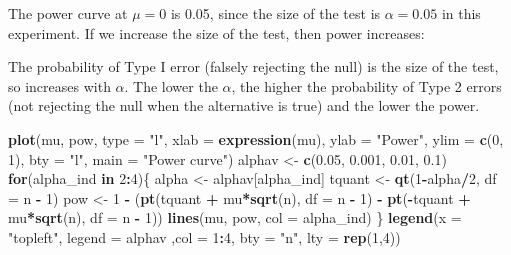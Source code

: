 \documentclass[]{book}
\newenvironment{Shaded}{\begin{snugshade}}{\end{snugshade}}
\newcommand{\ControlFlowTok}[1]{\textcolor[rgb]{0.13,0.29,0.53}{\textbf{#1}}}
\newcommand{\DataTypeTok}[1]{\textcolor[rgb]{0.13,0.29,0.53}{#1}}
\newcommand{\DecValTok}[1]{\textcolor[rgb]{0.00,0.00,0.81}{#1}}
\newcommand{\FloatTok}[1]{\textcolor[rgb]{0.00,0.00,0.81}{#1}}
\newcommand{\KeywordTok}[1]{\textcolor[rgb]{0.13,0.29,0.53}{\textbf{#1}}}
\newcommand{\NormalTok}[1]{#1}
\newcommand{\OperatorTok}[1]{\textcolor[rgb]{0.81,0.36,0.00}{\textbf{#1}}}
\newcommand{\StringTok}[1]{\textcolor[rgb]{0.31,0.60,0.02}{#1}}
\theoremstyle{definition}
\theoremstyle{definition}
\theoremstyle{definition}
\theoremstyle{remark}
\begin{document}
The power curve at \(\mu=0\) is 0.05, since the size of the test is
\(\alpha= 0.05\) in this experiment. If we increase the size of the
test, then power increases:

The probability of Type I error (falsely rejecting the null) is the size
of the test, so increases with \(\alpha\). The lower the \(\alpha\), the
higher the probability of Type 2 errors (not rejecting the null when the
alternative is true) and the lower the power.

\begin{Shaded}
\begin{Highlighting}[]
\KeywordTok{plot}\NormalTok{(mu, pow,}
     \DataTypeTok{type =} \StringTok{"l"}\NormalTok{, }\DataTypeTok{xlab =} \KeywordTok{expression}\NormalTok{(mu), }
     \DataTypeTok{ylab =} \StringTok{"Power"}\NormalTok{, }
     \DataTypeTok{ylim =} \KeywordTok{c}\NormalTok{(}\DecValTok{0}\NormalTok{, }\DecValTok{1}\NormalTok{), }\DataTypeTok{bty =} \StringTok{"l"}\NormalTok{,}
     \DataTypeTok{main =} \StringTok{"Power curve"}\NormalTok{)}
\NormalTok{ alphav <-}\StringTok{ }\KeywordTok{c}\NormalTok{(}\FloatTok{0.05}\NormalTok{, }\FloatTok{0.001}\NormalTok{, }\FloatTok{0.01}\NormalTok{, }\FloatTok{0.1}\NormalTok{)}
\ControlFlowTok{for}\NormalTok{(alpha_ind }\ControlFlowTok{in} \DecValTok{2}\OperatorTok{:}\DecValTok{4}\NormalTok{)\{}
\NormalTok{  alpha <-}\StringTok{ }\NormalTok{alphav[alpha_ind]}
\NormalTok{  tquant <-}\StringTok{ }\KeywordTok{qt}\NormalTok{(}\DecValTok{1}\OperatorTok{-}\NormalTok{alpha}\OperatorTok{/}\DecValTok{2}\NormalTok{, }\DataTypeTok{df =}\NormalTok{ n }\OperatorTok{-}\StringTok{ }\DecValTok{1}\NormalTok{)}
\NormalTok{  pow <-}\StringTok{ }\DecValTok{1} \OperatorTok{-}\StringTok{ }\NormalTok{(}\KeywordTok{pt}\NormalTok{(tquant }\OperatorTok{+}\StringTok{ }\NormalTok{mu}\OperatorTok{*}\KeywordTok{sqrt}\NormalTok{(n), }\DataTypeTok{df =}\NormalTok{ n }\OperatorTok{-}\StringTok{ }\DecValTok{1}\NormalTok{) }\OperatorTok{-}\StringTok{ }
\StringTok{                   }\KeywordTok{pt}\NormalTok{(}\OperatorTok{-}\NormalTok{tquant }\OperatorTok{+}\StringTok{ }\NormalTok{mu}\OperatorTok{*}\KeywordTok{sqrt}\NormalTok{(n), }\DataTypeTok{df =}\NormalTok{ n }\OperatorTok{-}\StringTok{ }\DecValTok{1}\NormalTok{))}
\KeywordTok{lines}\NormalTok{(mu, pow, }\DataTypeTok{col =}\NormalTok{ alpha_ind)}
\NormalTok{\}}
\KeywordTok{legend}\NormalTok{(}\DataTypeTok{x =} \StringTok{"topleft"}\NormalTok{, }\DataTypeTok{legend =}\NormalTok{ alphav ,}\DataTypeTok{col =} \DecValTok{1}\OperatorTok{:}\DecValTok{4}\NormalTok{, }\DataTypeTok{bty =} \StringTok{"n"}\NormalTok{, }\DataTypeTok{lty =} \KeywordTok{rep}\NormalTok{(}\DecValTok{1}\NormalTok{,}\DecValTok{4}\NormalTok{))}
\end{Highlighting}
\end{Shaded}
\end{document}
